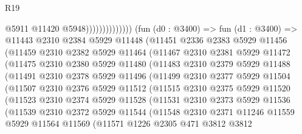 \begin{lexlean}{R19}
\begin{coremodule}
                                    @5911
                                    @11420
                                    @5948))))))))))))))
        (fun (d0 : @3400) =>
        fun (d1 : @3400) =>
        @11443
          @2310
          @2384
          @5929
          @11448
          (@11451
            @2336
            @2383
            @5929
            @11456
            (@11459
              @2310
              @2382
              @5929
              @11464
              (@11467
                @2310
                @2381
                @5929
                @11472
                (@11475
                  @2310
                  @2380
                  @5929
                  @11480
                  (@11483
                    @2310
                    @2379
                    @5929
                    @11488
                    (@11491
                      @2310
                      @2378
                      @5929
                      @11496
                      (@11499
                        @2310
                        @2377
                        @5929
                        @11504
                        (@11507
                          @2310
                          @2376
                          @5929
                          @11512
                          (@11515
                            @2310
                            @2375
                            @5929
                            @11520
                            (@11523
                              @2310
                              @2374
                              @5929
                              @11528
                              (@11531
                                @2310
                                @2373
                                @5929
                                @11536
                                (@11539
                                  @2310
                                  @2372
                                  @5929
                                  @11544
                                  (@11548
                                    @2310
                                    @2371
                                    @11246
                                    @11559
                                    @5929
                                    @11564
                                    @11569
                                    (@11571
                                      @1226
                                      @2305
                                      @471
                                      @3812
                                      @3812

\end{coremodule}
\end{lexlean}

